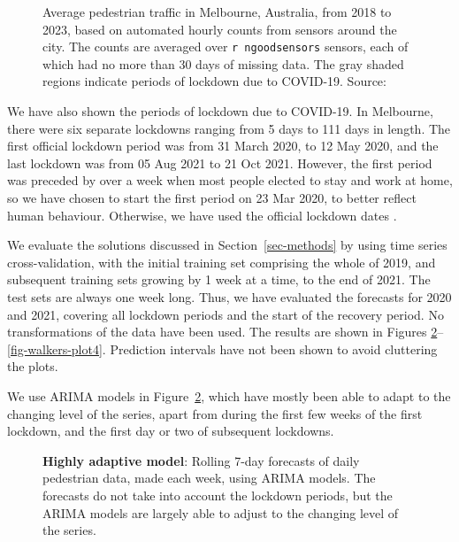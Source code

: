 \documentclass[
  11pt,
  a4paper,
]{article}
\begin{document}
\begin{figure}


\caption{\label{fig-walkers}Average pedestrian traffic in Melbourne,
Australia, from 2018 to 2023, based on automated hourly counts from
sensors around the city. The counts are averaged over
\texttt{r\ ngoodsensors} sensors, each of which had no more than 30 days
of missing data. The gray shaded regions indicate periods of lockdown
due to COVID-19. Source: \textcite{pedestrians}}

\end{figure}%

We have also shown the periods of lockdown due to COVID-19. In
Melbourne, there were six separate lockdowns ranging from 5 days to 111
days in length. The first official lockdown period was from 31 March
2020, to 12 May 2020, and the last lockdown was from 05 Aug 2021 to 21
Oct 2021. However, the first period was preceded by over a week when
most people elected to stay and work at home, so we have chosen to start
the first period on 23 Mar 2020, to better reflect human behaviour.
Otherwise, we have used the official lockdown dates
\autocite{MelbourneLockdowns}.

We evaluate the solutions discussed in Section~\ref{sec-methods} by
using time series cross-validation, with the initial training set
comprising the whole of 2019, and subsequent training sets growing by 1
week at a time, to the end of 2021. The test sets are always one week
long. Thus, we have evaluated the forecasts for 2020 and 2021, covering
all lockdown periods and the start of the recovery period. No
transformations of the data have been used. The results are shown in
Figures \ref{fig-walkers-plot1}--\ref{fig-walkers-plot4}. Prediction
intervals have not been shown to avoid cluttering the plots.

We use ARIMA models in Figure~\ref{fig-walkers-plot1}, which have mostly
been able to adapt to the changing level of the series, apart from
during the first few weeks of the first lockdown, and the first day or
two of subsequent lockdowns.

\begin{figure}


\caption{\label{fig-walkers-plot1}\textbf{Highly adaptive model}:
Rolling 7-day forecasts of daily pedestrian data, made each week, using
ARIMA models. The forecasts do not take into account the lockdown
periods, but the ARIMA models are largely able to adjust to the changing
level of the series.}

\end{figure}%
\end{document}
